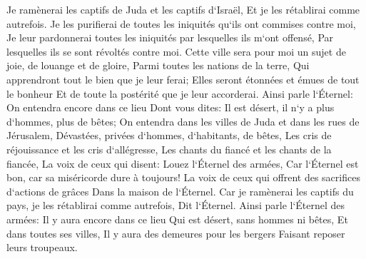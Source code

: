\verse Je ramènerai les captifs de Juda et les captifs d`Israël, Et je les rétablirai comme autrefois. 
\verse Je les purifierai de toutes les iniquités qu`ils ont commises contre moi, Je leur pardonnerai toutes les iniquités par lesquelles ils m`ont offensé, Par lesquelles ils se sont révoltés contre moi. 
\verse Cette ville sera pour moi un sujet de joie, de louange et de gloire, Parmi toutes les nations de la terre, Qui apprendront tout le bien que je leur ferai; Elles seront étonnées et émues de tout le bonheur Et de toute la postérité que je leur accorderai. 
\verse Ainsi parle l`Éternel: On entendra encore dans ce lieu Dont vous dites: Il est désert, il n`y a plus d`hommes, plus de bêtes; On entendra dans les villes de Juda et dans les rues de Jérusalem, Dévastées, privées d`hommes, d`habitants, de bêtes, 
\verse Les cris de réjouissance et les cris d`allégresse, Les chants du fiancé et les chants de la fiancée, La voix de ceux qui disent: Louez l`Éternel des armées, Car l`Éternel est bon, car sa miséricorde dure à toujours! La voix de ceux qui offrent des sacrifices d`actions de grâces Dans la maison de l`Éternel. Car je ramènerai les captifs du pays, je les rétablirai comme autrefois, Dit l`Éternel. 
\verse Ainsi parle l`Éternel des armées: Il y aura encore dans ce lieu Qui est désert, sans hommes ni bêtes, Et dans toutes ses villes, Il y aura des demeures pour les bergers Faisant reposer leurs troupeaux. 
